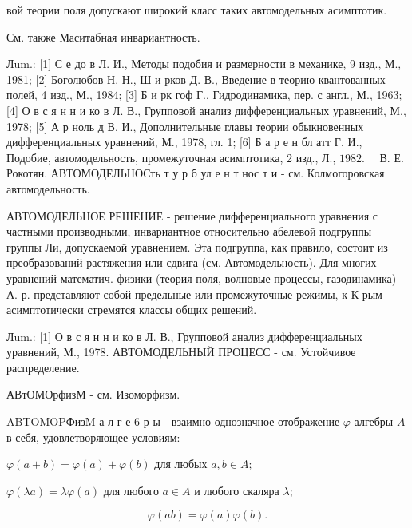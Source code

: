 \documentclass[10pt]{article}
\begin{document}
вой теории поля допускают широкий класс таких автомодельных асимптотик.



См. также Маситабная инвариантность.



Лum.: [1] С е до в Л. И., Методы подобия и размерности в механике, 9 изд., М., 1981; [2] Боголюбов Н. Н., Ш и рков Д. В., Введение в теорию квантованных полей, 4 изд., М., 1984; [3] Б и рк гоф Г., Гидродинамика, пер. с англ., М., 1963; [4] О в с я н н и ко в Л. В., Групповой анализ дифференциальных уравнений, М., 1978; [5] А р ноль д В. И., Дополнительные главы теории обыкновенных дифференциальных уравнений, М., 1978, гл. 1; [6] Б а р е н бл атт Г. И., Подобие, автомодельность, промежуточная асимптотика, 2 изд., Л., $1982 . \quad$ В. Е. Рокотян. АВТОМОДЕЛЬНОСть т у р б ул е н т нос т и - см. Колмогоровская автомодельность.



АВТОМОДЕЛЬНОЕ РЕШЕНИЕ - решение дифференциального уравнения с частными производными, инвариантное относительно абелевой подгруппы группы Ли, допускаемой уравнением. Эта подгруппа, как правило, состоит из преобразований растяжения или сдвига (см. Автомодельность). Для многих уравнений математич. физики (теория поля, волновые процессы, газодинамика) А. р. представляют собой предельные или промежуточные режимы, к К-рым асимптотически стремятся классы общих решений.



Лum.: [1] О в с я н н и ко в Л. В., Групповой анализ дифференциальных уравнений, М., 1978. АВТОМОДЕЛЬНЫЙ ПРОЦЕСС - см. Устойчивое распределение.



АВтОМОрфизМ - см. Изоморфизм.



ABTOMOPФизM а л г е 6 р ы - взаимно однозначное отображение $\varphi$ алгебры $A$ в себя, удовлетворяющее условиям:



$\varphi(a+b)=\varphi(a)+\varphi(b)$ для любых $a, b \in A ;$



$\varphi(\lambda a)=\lambda \varphi(a)$ для любого $a \in A$ и любого скаляра $\lambda$;



\[

\varphi(a b)=\varphi(a) \varphi(b) .

\]
\end{document}
